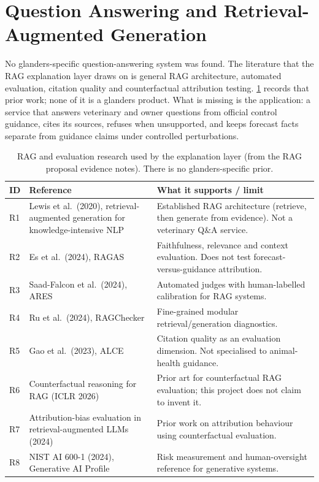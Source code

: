\documentclass[10pt,openany]{report}
\begin{document}
\section{Question Answering and Retrieval-Augmented Generation}
\label{sec:rag-related}

No glanders-specific question-answering system was found. The literature that the RAG explanation
layer draws on is general RAG architecture, automated evaluation, citation quality and
counterfactual attribution testing. \cref{tab:rag-compare} records that prior work; none of it is a
glanders product. What is missing is the application: a service that answers veterinary and owner
questions from official control guidance, cites its sources, refuses when unsupported, and keeps
forecast facts separate from guidance claims under controlled perturbations.

\begin{table}[htbp]
\centering
\caption[RAG literature used by the explanation layer]{RAG and evaluation research used by the
explanation layer (from the RAG proposal evidence notes). There is no glanders-specific prior.}
\label{tab:rag-compare}
\small
\begin{tabular}{@{}>{\raggedright\arraybackslash}p{1.0cm}
                >{\raggedright\arraybackslash}p{5.6cm}
                >{\raggedright\arraybackslash}p{7.4cm}@{}}
\toprule
\textbf{ID} & \textbf{Reference} & \textbf{What it supports / limit} \\
\midrule
R1 &
Lewis et al.\ (2020), retrieval-augmented generation for knowledge-intensive NLP \cite{lewis2020} &
Established RAG architecture (retrieve, then generate from evidence). Not a veterinary Q\&A service. \\
R2 &
Es et al.\ (2024), RAGAS \cite{es2024} &
Faithfulness, relevance and context evaluation. Does not test forecast-versus-guidance attribution. \\
R3 &
Saad-Falcon et al.\ (2024), ARES \cite{saadfalcon2024} &
Automated judges with human-labelled calibration for RAG systems. \\
R4 &
Ru et al.\ (2024), RAGChecker \cite{ru2024} &
Fine-grained modular retrieval/generation diagnostics. \\
R5 &
Gao et al.\ (2023), ALCE \cite{gao2023} &
Citation quality as an evaluation dimension. Not specialised to animal-health guidance. \\
R6 &
Counterfactual reasoning for RAG (ICLR 2026) \cite{counterfactualrag2026} &
Prior art for counterfactual RAG evaluation; this project does not claim to invent it. \\
R7 &
Attribution-bias evaluation in retrieval-augmented LLMs (2024) \cite{attrbias2024} &
Prior work on attribution behaviour using counterfactual evaluation. \\
R8 &
NIST AI 600-1 (2024), Generative AI Profile \cite{nist2024} &
Risk measurement and human-oversight reference for generative systems. \\
\bottomrule
\end{tabular}
\end{table}
\end{document}
